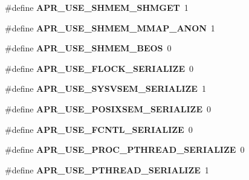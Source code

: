 \begin{DoxyCompactItemize}
\item 
\hypertarget{group__apr__platform_ga04fb6b9c97e668cef00645dd05c45079}{\#define {\bfseries A\-P\-R\-\_\-\-U\-S\-E\-\_\-\-S\-H\-M\-E\-M\-\_\-\-S\-H\-M\-G\-E\-T}~1}\label{group__apr__platform_ga04fb6b9c97e668cef00645dd05c45079}

\item 
\hypertarget{group__apr__platform_ga7b556f92b8b710978339dc827d2a7a22}{\#define {\bfseries A\-P\-R\-\_\-\-U\-S\-E\-\_\-\-S\-H\-M\-E\-M\-\_\-\-M\-M\-A\-P\-\_\-\-A\-N\-O\-N}~1}\label{group__apr__platform_ga7b556f92b8b710978339dc827d2a7a22}

\item 
\hypertarget{group__apr__platform_ga964a36a0d15537eb89733bd92e1159cd}{\#define {\bfseries A\-P\-R\-\_\-\-U\-S\-E\-\_\-\-S\-H\-M\-E\-M\-\_\-\-B\-E\-O\-S}~0}\label{group__apr__platform_ga964a36a0d15537eb89733bd92e1159cd}

\item 
\hypertarget{group__apr__platform_ga627ab3fb1738314c7e50616e7e4e9370}{\#define {\bfseries A\-P\-R\-\_\-\-U\-S\-E\-\_\-\-F\-L\-O\-C\-K\-\_\-\-S\-E\-R\-I\-A\-L\-I\-Z\-E}~0}\label{group__apr__platform_ga627ab3fb1738314c7e50616e7e4e9370}

\item 
\hypertarget{group__apr__platform_ga91ab4154618c08a76cc688ec3f384a27}{\#define {\bfseries A\-P\-R\-\_\-\-U\-S\-E\-\_\-\-S\-Y\-S\-V\-S\-E\-M\-\_\-\-S\-E\-R\-I\-A\-L\-I\-Z\-E}~1}\label{group__apr__platform_ga91ab4154618c08a76cc688ec3f384a27}

\item 
\hypertarget{group__apr__platform_gab41840f9559a2eda0aed18e24911d4fa}{\#define {\bfseries A\-P\-R\-\_\-\-U\-S\-E\-\_\-\-P\-O\-S\-I\-X\-S\-E\-M\-\_\-\-S\-E\-R\-I\-A\-L\-I\-Z\-E}~0}\label{group__apr__platform_gab41840f9559a2eda0aed18e24911d4fa}

\item 
\hypertarget{group__apr__platform_ga66b87d9b0c7e5b97b8fb21f55a0714d7}{\#define {\bfseries A\-P\-R\-\_\-\-U\-S\-E\-\_\-\-F\-C\-N\-T\-L\-\_\-\-S\-E\-R\-I\-A\-L\-I\-Z\-E}~0}\label{group__apr__platform_ga66b87d9b0c7e5b97b8fb21f55a0714d7}

\item 
\hypertarget{group__apr__platform_ga2738f508b5926ec10a966d2bdb348452}{\#define {\bfseries A\-P\-R\-\_\-\-U\-S\-E\-\_\-\-P\-R\-O\-C\-\_\-\-P\-T\-H\-R\-E\-A\-D\-\_\-\-S\-E\-R\-I\-A\-L\-I\-Z\-E}~0}\label{group__apr__platform_ga2738f508b5926ec10a966d2bdb348452}

\item 
\hypertarget{group__apr__platform_ga28fb90a0db4bd6c6f677b269fc743cda}{\#define {\bfseries A\-P\-R\-\_\-\-U\-S\-E\-\_\-\-P\-T\-H\-R\-E\-A\-D\-\_\-\-S\-E\-R\-I\-A\-L\-I\-Z\-E}~1}\label{group__apr__platform_ga28fb90a0db4bd6c6f677b269fc743cda}


\end{DoxyCompactItemize}
